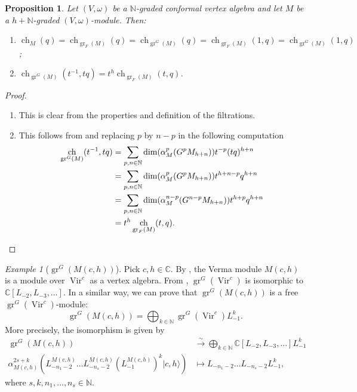 \documentclass[a4paper, 12pt, reqno]{amsart}
\newtheorem{proposition}[theorem]{Proposition}
\theoremstyle{remark}
\newtheorem{example}[theorem]{Example}
\numberwithin{equation}{subsection}
\DeclareMathOperator{\Vir}{Vir}
\DeclareMathOperator{\gr}{gr}
\DeclareMathOperator{\ch}{ch}
\begin{document}
\begin{proposition}
  \label{prp:13}
  Let $(V, \omega)$ be a $\mathbb{N}$-graded conformal vertex algebra and let $M$ be a $h + \mathbb{N}$-graded $(V, \omega)$-module.
  Then:
  \begin{enumerate}
  \item $\ch_M(q) = \ch_{\gr_F(M)}(q) = \ch_{\gr^G(M)}(q) = \ch_{\gr_F(M)}(1, q) = \ch_{\gr^G(M)}(1, q)$;
  \item $\ch_{\gr^G(M)}(t^{-1}, tq) = t^h\ch_{\gr_F(M)}(t, q)$.
  \end{enumerate}
\end{proposition}

\begin{proof}\leavevmode
  \begin{enumerate}
  \item This is clear from the properties and definition of the filtrations.
  \item This follows from  and replacing $p$ by $n - p$ in the following computation
    \begin{align*}
    \ch_{\gr^G(M)}(t^{-1}, tq) &= \sum_{p, n \in \mathbb{N}}\dim(\alpha^p_M(G^pM_{h + n}))t^{-p}(tq)^{h+n} \\
    &= \sum_{p, n \in \mathbb{N}}\dim(\alpha^p_M(G^pM_{h + n}))t^{h + n - p}q^{h + n} \\
    &= \sum_{p, n \in \mathbb{N}}\dim(\alpha^{n - p}_M(G^{n - p}M_{h + n}))t^{h + p}q^{h + n} \\
    &= t^h\ch_{\gr_F(M)}(t, q). \qedhere
    \end{align*}
  \end{enumerate}
\end{proof}

\begin{example}[$\gr^G(M(c, h))$]
  \label{exa:13}
  Pick $c, h \in \mathbb{C}$.
  By , the Verma module $M(c, h)$ is a module over $\Vir^c$ as a vertex algebra.
  From , $\gr^G(\Vir^c)$ is isomorphic to $\mathbb{C}[L_{-2}, L_{-3}, \dots]$.
  In a similar way, we can prove that $\gr^G(M(c, h))$ is a free $\gr^G(\Vir^c)$-module:
  \begin{equation*}
    \gr^G(M(c, h)) = \bigoplus_{k \in \mathbb{N}}\gr^G(\Vir^c)L_{-1}^k.
  \end{equation*}
  More precisely, the isomorphism is given by
  \begin{align*}
    \gr^G(M(c, h)) &\xrightarrow{\sim} \bigoplus_{k \in \mathbb{N}}\mathbb{C}[L_{-2}, L_{-3}, \dots]L_{-1}^k \\
    \alpha_{M(c, h)}^{2s + k}(L_{-n_1 - 2}^{M(c, h)}\dots L_{-n_s - 2}^{M(c, h)}(L_{-1}^{M(c, h)})^k|c, h\rangle) &\mapsto L_{-n_1 - 2}\dots L_{-n_s - 2}L_{-1}^k,
  \end{align*}
  where $s, k, n_1, \dots, n_s \in \mathbb{N}$.
\end{example}
\end{document}
